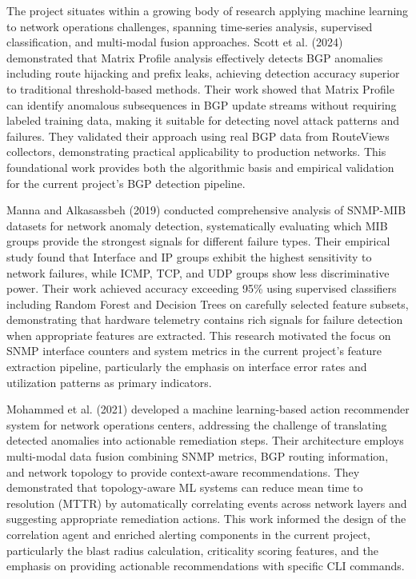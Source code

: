 \documentclass[11pt]{article}
\begin{document}
The project situates within a growing body of research applying machine learning to network operations challenges, spanning time-series analysis, supervised classification, and multi-modal fusion approaches. Scott et al. (2024) demonstrated that Matrix Profile analysis effectively detects BGP anomalies including route hijacking and prefix leaks, achieving detection accuracy superior to traditional threshold-based methods. Their work showed that Matrix Profile can identify anomalous subsequences in BGP update streams without requiring labeled training data, making it suitable for detecting novel attack patterns and failures. They validated their approach using real BGP data from RouteViews collectors, demonstrating practical applicability to production networks. This foundational work provides both the algorithmic basis and empirical validation for the current project's BGP detection pipeline.

Manna and Alkasassbeh (2019) conducted comprehensive analysis of SNMP-MIB datasets for network anomaly detection, systematically evaluating which MIB groups provide the strongest signals for different failure types. Their empirical study found that Interface and IP groups exhibit the highest sensitivity to network failures, while ICMP, TCP, and UDP groups show less discriminative power. Their work achieved accuracy exceeding 95\% using supervised classifiers including Random Forest and Decision Trees on carefully selected feature subsets, demonstrating that hardware telemetry contains rich signals for failure detection when appropriate features are extracted. This research motivated the focus on SNMP interface counters and system metrics in the current project's feature extraction pipeline, particularly the emphasis on interface error rates and utilization patterns as primary indicators.

Mohammed et al. (2021) developed a machine learning-based action recommender system for network operations centers, addressing the challenge of translating detected anomalies into actionable remediation steps. Their architecture employs multi-modal data fusion combining SNMP metrics, BGP routing information, and network topology to provide context-aware recommendations. They demonstrated that topology-aware ML systems can reduce mean time to resolution (MTTR) by automatically correlating events across network layers and suggesting appropriate remediation actions. This work informed the design of the correlation agent and enriched alerting components in the current project, particularly the blast radius calculation, criticality scoring features, and the emphasis on providing actionable recommendations with specific CLI commands.
\end{document}
